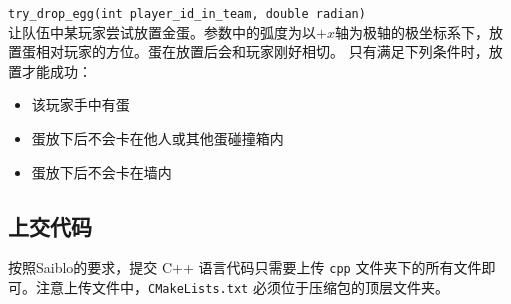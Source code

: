 \documentclass{article}
\begin{document}
\begin{description}
\lstinline{try_drop_egg(int player_id_in_team, double radian)}\\[-2pt]
让队伍中某玩家尝试放置金蛋。参数中的弧度为以$+x$轴为极轴的极坐标系下，放置蛋相对玩家的方位。蛋在放置后会和玩家刚好相切。
只有满足下列条件时，放置才能成功：

\begin{itemize}\setlength\itemsep{0em}
\item 该玩家手中有蛋
\item 蛋放下后不会卡在他人或其他蛋碰撞箱内
\item 蛋放下后不会卡在墙内
\end{itemize}

\end{description}

\subsection{上交代码}

按照Saiblo的要求，提交 C++ 语言代码只需要上传 \texttt{cpp} 文件夹下的所有文件即可。注意上传文件中，\texttt{CMakeLists.txt} 必须位于压缩包的顶层文件夹。
\end{document}
